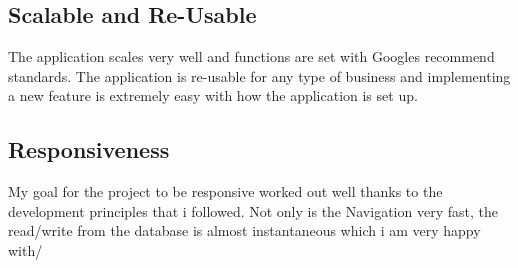 \subsection{Scalable and Re-Usable}
The application scales very well and functions are set with Googles recommend standards. The application is re-usable for any type of business and implementing a new feature is extremely easy with how the application is set up.

\subsection{Responsiveness}
My goal for the project to be responsive worked out well thanks to the development principles that i followed. Not only is the Navigation very fast, the read/write from the database is almost instantaneous which i am very happy with/